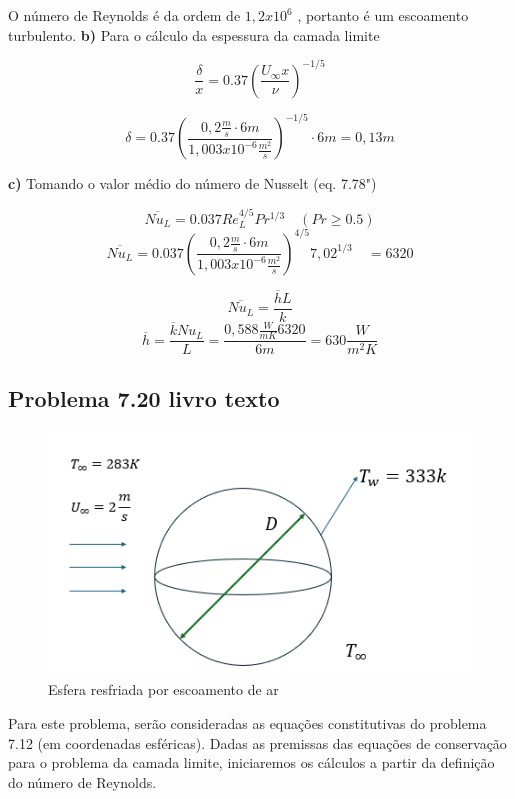 \documentclass[12pt]{article}
\begin{document}
O número de Reynolds é da ordem de $1,2 x 10^{6}$ , portanto é um escoamento turbulento.
\textbf{b)} Para o cálculo da espessura da camada limite

\begin{equation}
	\frac{\delta}{x} = 0.37 \left( \frac{U_\infty x}{\nu} \right)^{-1/5}
\end{equation}

\begin{equation}
	\delta = 0.37 \left(  \frac{0,2 \frac{m}{s} \cdotp 6m}{1,003 x 10^{-6}\frac{m^2}{s}}\right)^{-1/5}\cdotp6m = 0,13m
\end{equation}

\textbf{c)} Tomando o valor médio do número de Nusselt (eq. 7.78")

\begin{equation}
	\overline{Nu_L} = 0.037 Re_L^{4/5} Pr^{1/3} \quad (Pr \geq 0.5)
\end{equation}
\begin{equation}
	\overline{Nu_L} = 0.037 \left(  \frac{0,2 \frac{m}{s} \cdotp 6m}{1,003 x 10^{-6}\frac{m^2}{s}}\right)^{4/5} 7,02^{1/3} \quad = 6320
\end{equation}

\begin{equation}
	\overline{Nu_L} = \frac{\overline{h}L}{k}
\end{equation}
\begin{equation}
	\overline{h} = \frac{\overline{k}{Nu_L}}{L} = \frac{0,588 \frac{W}{mK}6320}{6m} = 630\frac{W}{m^{2}K}
\end{equation}

\subsection*{Problema 7.20 livro texto}

\begin{figure}[H]
	\centering
	\includegraphics[width=.65\textwidth]{Figures/1_2}
	\caption{Esfera resfriada por escoamento de ar}
\end{figure}
Para este problema, serão consideradas as equações constitutivas do problema 7.12 (em coordenadas esféricas). Dadas as premissas das equações de conservação para o problema da camada limite, iniciaremos os cálculos a partir da definição do número de Reynolds.
\end{document}
